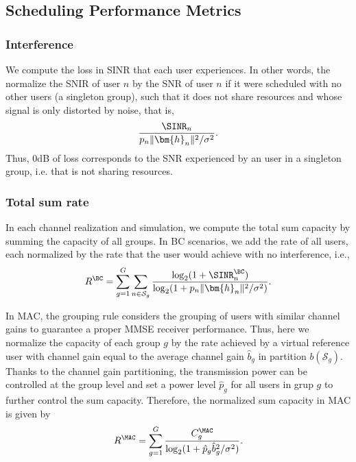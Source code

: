 \subsection{Scheduling Performance Metrics}
\subsubsection{Interference}
We compute the loss in SINR that each user experiences. In other words, the normalize the SNIR of user $n$ by the SNR of user $n$ if it were scheduled with no other users (a singleton group), such that it does not share resources and whose signal is only distorted by noise, that is,
\begin{align}
	\frac{\SINR_n}{p_n\|\bm{h}_n\|^2/\sigma^2}.\label{eqn:normalized_sinr}
\end{align}
Thus, 0dB of loss corresponds to the SNR experienced by an user in a singleton group, i.e. that is not sharing resources.
\subsubsection{Total sum rate}
In each channel realization and simulation, we compute the total sum capacity by summing the capacity of all groups. 
In BC scenarios, we add the rate of all users, each normalized by the rate that the user would achieve with no interference, i.e.,
\begin{align}
	R^{\BC}=\sum_{g=1}^G\sum_{n\in\mathcal{S}_g}\frac{\log_2(1+\SINR_n^{\BC})}{\log_2(1+p_n\|\bm{h}_n\|^2/\sigma^2)}.\label{eqn:normalized_sumcap_bc}
\end{align}

In MAC, the grouping rule considers the grouping of users with similar channel gains to guarantee a proper MMSE receiver performance. Thus, here we normalize the capacity of each group $g$ by the rate achieved by a virtual reference user with channel gain equal to the average channel gain $\hat{b}_g$ in partition $b(\mathcal{S}_g)$. Thanks to the channel gain partitioning, the transmission power can be controlled at the group level and set a power level $\hat{p}_g$ for all users in grup $g$ to further control the sum capacity. Therefore, the normalized sum capacity in MAC is given by
\begin{align}
	R^{\MAC}=\sum_{g=1}^G\frac{C_g^{\MAC}}{\log_2(1+\hat{p}_g\hat{b}_g^2/\sigma^2)}.\label{eqn:normalized_sumcap_mac}
\end{align}

